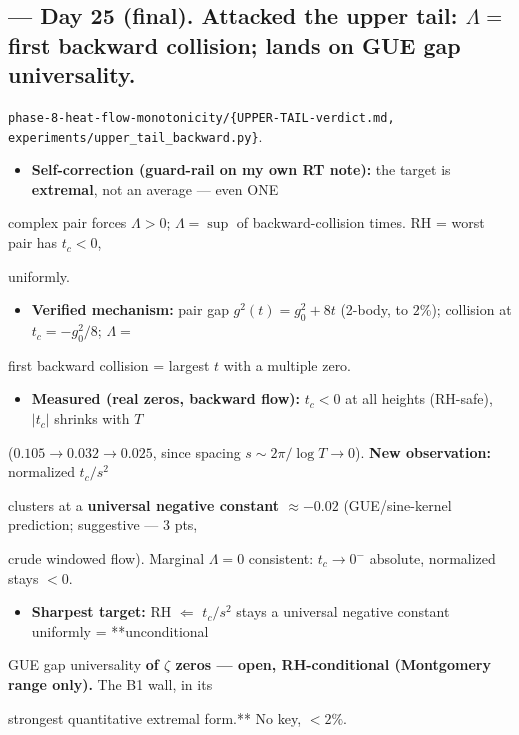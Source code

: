 \documentclass[10pt]{article}
\begin{document}
\subsection*{ --- Day 25 (final). Attacked the upper tail: $\Lambda=$ first backward collision; lands on GUE gap universality.}
\texttt{phase-8-heat-flow-monotonicity/\{UPPER-TAIL-verdict.md, experiments/upper\_tail\_backward.py\}}.\par
\begin{itemize}
\item \textbf{Self-correction (guard-rail on my own RT note):} the target is \textbf{extremal}, not an average --- even ONE
\end{itemize}
  complex pair forces $\Lambda>0$; $\Lambda=\sup$ of backward-collision times. RH = worst pair has $t_c<0$,\par
  uniformly.\par
\begin{itemize}
\item \textbf{Verified mechanism:} pair gap $g^2(t)=g_0^2+8t$ (2-body, to $2\%$); collision at $t_c=-g_0^2/8$; $\Lambda=$
\end{itemize}
  first backward collision = largest $t$ with a multiple zero.\par
\begin{itemize}
\item \textbf{Measured (real zeros, backward flow):} $t_c<0$ at all heights (RH-safe), $|t_c|$ shrinks with $T$
\end{itemize}
  ($0.105\to0.032\to0.025$, since spacing $s\sim2\pi/\log T\to0$). \textbf{New observation:} normalized $t_c/s^2$\par
  clusters at a \textbf{universal negative constant $\approx-0.02$} (GUE/sine-kernel prediction; suggestive --- 3 pts,\par
  crude windowed flow). Marginal $\Lambda=0$ consistent: $t_c\to0^-$ absolute, normalized stays $<0$.\par
\begin{itemize}
\item \textbf{Sharpest target:} RH $\Longleftarrow$ $t_c/s^2$ stays a universal negative constant uniformly = **unconditional
\end{itemize}
  GUE gap universality\textbf{ of $\zeta$ zeros --- open, RH-conditional (Montgomery range only). }The B1 wall, in its\par
  strongest quantitative extremal form.** No key, $<2\%$.\par
\end{document}
